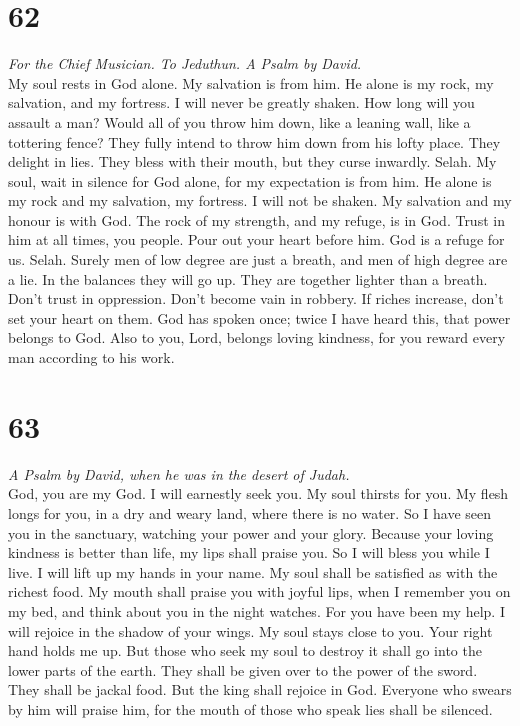 \hypertarget{section-61}{%
\section{62}\label{section-61}}

\emph{For the Chief Musician. To Jeduthun. A Psalm by David.}\\
 My soul rests in God alone. My salvation is from him.
 He alone is my rock, my salvation, and my fortress. I
will never be greatly shaken.  How long will you assault a
man? Would all of you throw him down, like a leaning wall, like a
tottering fence?  They fully intend to throw him down from
his lofty place. They delight in lies. They bless with their mouth, but
they curse inwardly. Selah.  My soul, wait in silence for
God alone, for my expectation is from him.  He alone is my
rock and my salvation, my fortress. I will not be shaken. 
My salvation and my honour is with God. The rock of my strength, and my
refuge, is in God.  Trust in him at all times, you people.
Pour out your heart before him. God is a refuge for us. Selah.
 Surely men of low degree are just a breath, and men of
high degree are a lie. In the balances they will go up. They are
together lighter than a breath.  Don't trust in
oppression. Don't become vain in robbery. If riches increase, don't set
your heart on them.  God has spoken once; twice I have
heard this, that power belongs to God.  Also to you,
Lord, belongs loving kindness, for you reward every man according to his
work.

\hypertarget{section-62}{%
\section{63}\label{section-62}}

\emph{A Psalm by David, when he was in the desert of Judah.}\\
 God, you are my God. I will earnestly seek you. My soul
thirsts for you. My flesh longs for you, in a dry and weary land, where
there is no water.  So I have seen you in the sanctuary,
watching your power and your glory.  Because your loving
kindness is better than life, my lips shall praise you. 
So I will bless you while I live. I will lift up my hands in your name.
 My soul shall be satisfied as with the richest food. My
mouth shall praise you with joyful lips,  when I remember
you on my bed, and think about you in the night watches. 
For you have been my help. I will rejoice in the shadow of your wings.
 My soul stays close to you. Your right hand holds me up.
 But those who seek my soul to destroy it shall go into
the lower parts of the earth.  They shall be given over
to the power of the sword. They shall be jackal food. 
But the king shall rejoice in God. Everyone who swears by him will
praise him, for the mouth of those who speak lies shall be silenced.

